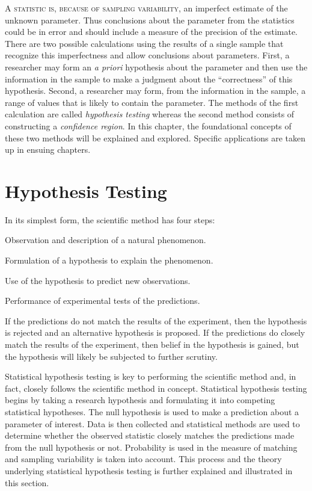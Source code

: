 \documentclass[10pt,openany]{book}\usepackage[]{graphicx}\usepackage[]{color}
\begin{document}
\minitoc
\newpage

\lettrine{A}{ statistic is, because of sampling variability,} an imperfect estimate of the unknown parameter.  Thus conclusions about the parameter from the statistics could be in error and should include a measure of the precision of the estimate.  There are two possible calculations using the results of a single sample that recognize this imperfectness and allow conclusions about parameters.  First, a researcher may form an \emph{a priori} hypothesis about the parameter and then use the information in the sample to make a judgment about the ``correctness'' of this hypothesis.  Second, a researcher may form, from the information in the sample, a range of values that is likely to contain the parameter.  The methods of the first calculation are called \emph{hypothesis testing} whereas the second method consists of constructing a \emph{confidence region}.  In this chapter, the foundational concepts of these two methods will be explained and explored.  Specific applications are taken up in ensuing chapters.


\section{Hypothesis Testing} \label{sect:HypTest}
In its simplest form, the scientific method has four steps:

\begin{Enumerate}
  \item Observation and description of a natural phenomenon.
  \item Formulation of a hypothesis to explain the phenomenon.
  \item Use of the hypothesis to predict new observations.
  \item Performance of experimental tests of the predictions.
\end{Enumerate}

If the predictions do not match the results of the experiment, then the hypothesis is rejected and an alternative hypothesis is proposed.  If the predictions do closely match the results of the experiment, then belief in the hypothesis is gained, but the hypothesis will likely be subjected to further scrutiny.

Statistical hypothesis testing is key to performing the scientific method and, in fact, closely follows the scientific method in concept.  Statistical hypothesis testing begins by taking a research hypothesis and formulating it into competing statistical hypotheses.  The null hypothesis is used to make a prediction about a parameter of interest.  Data is then collected and statistical methods are used to determine whether the observed statistic closely matches the predictions made from the null hypothesis or not.  Probability is used in the measure of matching and sampling variability is taken into account.  This process and the theory underlying statistical hypothesis testing is further explained and illustrated in this section.
\end{document}
